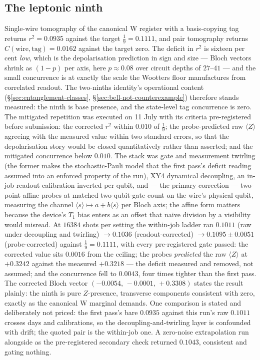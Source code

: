 \subsection{The leptonic ninth}
\label{app:hw-ninth}

Single-wire tomography of the canonical W register with a basis-copying tag returns
$r^{2} = 0.0935$ against the target $\tfrac19 = 0.1111$, and pair tomography returns
$C(\text{wire}, \text{tag}) = 0.0162$ against the target zero. The deficit in $r^{2}$ is sixteen
per cent \emph{low}, which is the depolarisation prediction in sign and size --- Bloch vectors
shrink as $(1-p)$ per axis, here $p \approx 0.08$ over circuit depths of $27$--$41$ --- and the
small concurrence is at exactly the scale the Wootters floor manufactures from correlated readout.
The two-ninths identity's operational content (\S\ref{sec:entanglement-classes},
\S\ref{sec:bell-not-counterexample}) therefore stands measured: the ninth is base presence, and
the state-level tag concurrence is zero. The mitigated repetition was executed on 11 July with its criteria pre-registered before
submission: the corrected $r^{2}$ within $0.010$ of $\tfrac19$; the probe-predicted raw
$\langle Z\rangle$ agreeing with the measured value within two standard errors, so that the
depolarisation story would be closed quantitatively rather than asserted; and the mitigated
concurrence below $0.010$. The stack was gate and measurement twirling (the former makes the
stochastic-Pauli model that the first pass's deficit reading assumed into an enforced property of
the run), XY4 dynamical decoupling, an in-job readout calibration inverted per qubit, and --- the
primary correction --- two-point affine probes at matched two-qubit-gate count on the wire's
physical qubit, measuring the channel $\langle s\rangle \mapsto a + b\langle s\rangle$ per Bloch
axis; the affine form matters because the device's $T_{1}$ bias enters as an offset that naive
division by a visibility would misread. At $16384$ shots per setting the within-job ladder ran
$0.1011$ (raw under decoupling and twirling) $\to 0.1036$ (readout-corrected) $\to
0.1095 \pm 0.0051$ (probe-corrected) against $\tfrac19 = 0.1111$, with every pre-registered gate
passed: the corrected value sits $0.0016$ from the ceiling; the probes \emph{predicted} the raw
$\langle Z\rangle$ at $+0.3242$ against the measured $+0.3218$ --- the deficit measured and
removed, not assumed; and the concurrence fell to $0.0043$, four times tighter than the first
pass. The corrected Bloch vector $(-0.0054,\, -0.0001,\, +0.3308)$ states the result plainly: the
ninth is pure $Z$-presence, transverse components consistent with zero, exactly as the canonical W
marginal demands. One comparison is stated and deliberately not priced: the first pass's bare
$0.0935$ against this run's raw $0.1011$ crosses days and calibrations, so the
decoupling-and-twirling layer is confounded with drift; the quoted pair is the within-job one. A
zero-noise extrapolation run alongside as the pre-registered secondary check returned $0.1043$,
consistent and gating nothing.

